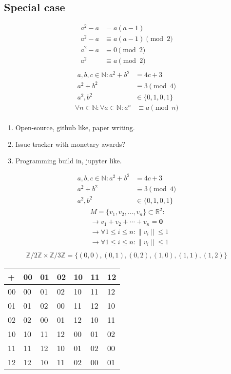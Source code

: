 \documentclass[a4paper,11pt]{article}
\theoremstyle{plain}
\theoremstyle{definition}
\newcommand{\R}{\mathbb{R}}
\newcommand{\N}{\mathbb{N}}
\newcommand{\Z}{\mathbb{Z}}
\begin{document}
\subsection{Special case}
\newpage
\begin{align*}
	a^2-a&=a(a-1)\\
	a^2-a&\equiv a(a-1) \pmod{2}\\
	a^2-a&\equiv 0 \pmod{2}\\
	a^2&\equiv a \pmod{2}\\
\end{align*}
\begin{align*}
	a,b,c\in\N: a^2+b^2&=4c+3\\
	a^2+b^2&\equiv 3 \pmod{4}\\
	a^2,b^2 &\in \{0,1,0,1\}
\end{align*}
\begin{align*}
	\forall n\in\N:\forall a\in\N: a^n &\equiv a \pmod{n}\\
\end{align*}
\begin{enumerate}
	\item Open-source, github like, paper writing.
	\item Issue tracker with monetary awards?
	\item Programming build in, jupyter like.
\end{enumerate}
\newpage
\begin{align*}
	a,b,c\in\N: a^2+b^2&=4c+3\\
	a^2+b^2&\equiv 3 \pmod{4}\\
	a^2,b^2 &\in \{0,1,0,1\}
\end{align*}
\begin{align*}
	&M = \{v_1,v_2,\dots,v_n\}\subset\R^2:\\
	&\rightarrow v_1+v_2+\cdots+v_n = \textbf{0} \\
	&\rightarrow \forall 1\leq i\leq n : \|v_i\|\leq 1\\
	&\rightarrow \forall 1\leq i\leq n : \|v_i\|\leq 1\\
\end{align*}
\begin{align*}
	\Z/2\Z\times\Z/3\Z = \{(0,0),(0,1),(0,2),(1,0),(1,1),(1,2)\}
\end{align*}
\begin{center}
\begin{tabular}{l|llllll}
	 + & 00 & 01 & 02 & 10 & 11 & 12 \\ \hline
	00 & 00 & 01 & 02 & 10 & 11 & 12 \\
	01 & 01 & 02 & 00 & 11 & 12 & 10 \\
	02 & 02 & 00 & 01 & 12 & 10 & 11 \\
	10 & 10 & 11 & 12 & 00 & 01 & 02 \\
	11 & 11 & 12 & 10 & 01 & 02 & 00 \\
	12 & 12 & 10 & 11 & 02 & 00 & 01 \\
\end{tabular}
\end{center}
\end{document}
